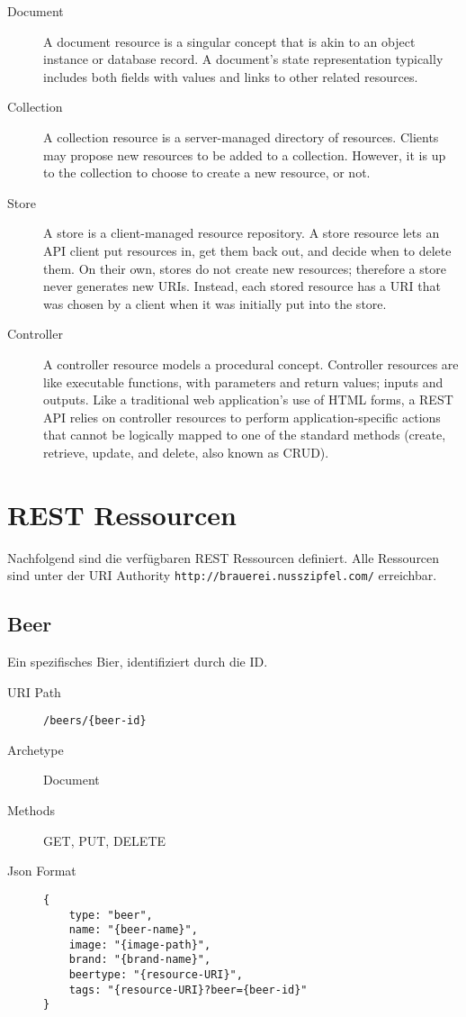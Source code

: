 \documentclass[10pt,a4paper]{scrartcl}
\begin{document}
\begin{description}
	\item[Document] A document resource is a singular concept that is akin to an object instance or database
		record. A document’s state representation typically includes both fields with values and
		links to other related resources.
	\item[Collection] A collection resource is a server-managed directory of resources. Clients may propose
		new resources to be added to a collection. However, it is up to the collection to choose
		to create a new resource, or not.
	\item[Store] A store is a client-managed resource repository. A store resource lets an API client put
		resources in, get them back out, and decide when to delete them. On their own, stores
		do not create new resources; therefore a store never generates new URIs. Instead, each
		stored resource has a URI that was chosen by a client when it was initially put into the
		store.
	\item[Controller] A controller resource models a procedural concept. Controller resources are like
		executable functions, with parameters and return values; inputs and outputs.
		Like a traditional web application’s use of HTML forms, a REST API relies on controller
		resources to perform application-specific actions that cannot be logically mapped to
		one of the standard methods (create, retrieve, update, and delete, also known as
		CRUD).
\end{description}


\section{REST Ressourcen}

Nachfolgend sind die verfügbaren REST Ressourcen definiert. Alle Ressourcen sind
unter der URI Authority \texttt{http://brauerei.nusszipfel.com/} erreichbar.


\subsection{Beer}

Ein spezifisches Bier, identifiziert durch die ID.

\begin{description}
	\item[URI Path] \texttt{/beers/\{beer-id\}}
	\item[Archetype] Document
	\item[Methods] GET, PUT, DELETE
	\item[Json Format] \hfill
\begin{lstlisting}
{
	type: "beer",
	name: "{beer-name}",
	image: "{image-path}",
	brand: "{brand-name}",
	beertype: "{resource-URI}",
	tags: "{resource-URI}?beer={beer-id}"
}
\end{lstlisting}
\end{description}
\end{document}

